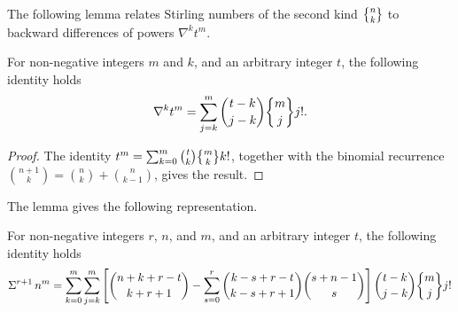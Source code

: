 The following lemma relates Stirling numbers of the second kind $\stirlingii{n}{k}$
to backward differences of powers $\nabla^{k} t^{m}$.
\begin{lemma} 
  For non-negative integers $m$ and $k$, and an arbitrary integer $t$, the following identity holds
  \label{lem:stirling-backward-differencess}
  \begin{align*}
    \nabla^{k} t^{m} = \sum_{j=k}^{m} \binom{t-k}{j-k} \stirlingii{m}{j} j!.
  \end{align*}
  \begin{proof}
    The identity $t^m  = \sum_{k=0}^{m} \binom{t}{k} \stirlingii{m}{k} k!$,
    together with the binomial recurrence
    $\binom{n+1}{k} = \binom{n}{k} + \binom{n}{k-1}$, gives the result.
  \end{proof}
\end{lemma}
The lemma gives the following representation.
\begin{proposition} 
  \label{prop:multifold-stirling-sums-of-powers}
  For non-negative integers $r$, $n$, and $m$, and an arbitrary integer $t$, the following identity holds
  \begin{align*}
    \KnuthRFoldSum{r+1}{n}{m}
    =
    \sum_{k=0}^{m}
    \sum_{j=k}^{m}
    \left[
      \binom{n+k+r-t}{k+r+1}
      -
      \sum_{s=0}^{r}
      \binom{k-s+r-t}{k-s+r+1} \binom{s+n-1}{s}
    \right] \binom{t-k}{j-k} \stirlingii{m}{j} j!
  \end{align*}
\end{proposition}
